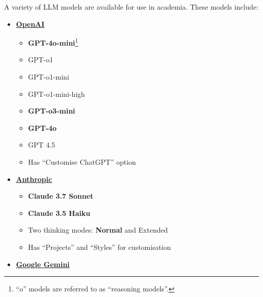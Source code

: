 \documentclass[
  10t,
]{article}
\providecommand{\tightlist}{%
  \setlength{\itemsep}{0pt}\setlength{\parskip}{0pt}}
\begin{document}
A variety of LLM models are available for use in academia. These models
include:

\begin{itemize}
\tightlist
\item
  \href{https://openai.com/}{\textbf{OpenAI}}

  \begin{itemize}
  \tightlist
  \item
    \textbf{GPT-4o-mini}\footnote{``o'' models are referred to as
      ``reasoning models''.}
  \item
    GPT-o1
  \item
    GPT-o1-mini
  \item
    GPT-o1-mini-high
  \item
    \textbf{GPT-o3-mini}
  \item
    \textbf{GPT-4o}
  \item
    GPT 4.5
  \item
    Has ``Customise ChatGPT'' option
  \end{itemize}
\item
  \href{https://www.anthropic.com/}{\textbf{Anthropic}}

  \begin{itemize}
  \tightlist
  \item
    \textbf{Claude 3.7 Sonnet}
  \item
    \textbf{Claude 3.5 Haiku}
  \item
    Two thinking modes: \textbf{Normal} and Extended
  \item
    Has ``Projects'' and ``Styles'' for customisation
  \end{itemize}
\item
  \href{https://one.google.com/intl/en_za/about/ai-premium/}{\textbf{Google
  Gemini}}


\end{itemize}
\end{document}
